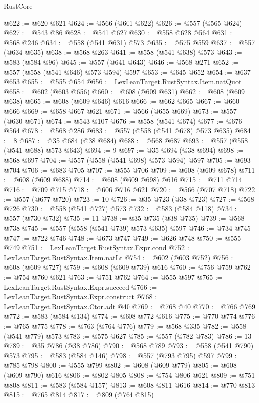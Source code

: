 \begin{lexlean}{RustCore}
\begin{coremodule}
@622 := @620 @621
@624 := @566 (@601 @622)
@626 := @557 (@565 @624)
@627 := @543 @86
@628 := @541 @627
@630 := @558 @628 @564
@631 := @568 @246
@634 := @558 (@541 @631) @573
@635 := @575 @559
@637 := @557 (@634 @635)
@638 := @568 @263
@641 := @558 (@541 @638) @573
@643 := @583 (@584 @96)
@645 := @557 (@641 @643)
@646 := @568 @271
@652 := @557 (@558 (@541 @646) @573 @594) @597
@653 := @645 @652
@654 := @637 @653
@655 := @555 @654
@656 := LexLeanTarget.RustSyntax.Item.natQuot
@658 := @602 (@603 @656)
@660 := @608 (@609 @631)
@662 := @608 (@609 @638)
@665 := @608 (@609 @646) @616
@666 := @662 @665
@667 := @660 @666
@669 := @658 @667 @621
@671 := @566 (@655 @669)
@673 := @557 (@630 @671)
@674 := @543 @107
@676 := @558 (@541 @674)
@677 := @676 @564
@678 := @568 @286
@683 := @557 (@558 (@541 @678) @573 @635)
@684 := 8
@687 := @35 @684 (@38 @684)
@688 := @568 @687
@693 := @557 (@558 (@541 @688) @573 @643)
@694 := 9
@697 := @35 @694 (@38 @694)
@698 := @568 @697
@704 := @557 (@558 (@541 @698) @573 @594) @597
@705 := @693 @704
@706 := @683 @705
@707 := @555 @706
@709 := @608 (@609 @678)
@711 := @608 (@609 @688)
@714 := @608 (@609 @698) @616
@715 := @711 @714
@716 := @709 @715
@718 := @606 @716 @621
@720 := @566 (@707 @718)
@722 := @557 (@677 @720)
@723 := 10
@726 := @35 @723 (@38 @723)
@727 := @568 @726
@730 := @558 (@541 @727) @573
@732 := @583 (@584 @118)
@734 := @557 (@730 @732)
@735 := 11
@738 := @35 @735 (@38 @735)
@739 := @568 @738
@745 := @557 (@558 (@541 @739) @573 @635) @597
@746 := @734 @745
@747 := @722 @746
@748 := @673 @747
@749 := @626 @748
@750 := @555 @749
@751 := LexLeanTarget.RustSyntax.Expr.cond
@752 := LexLeanTarget.RustSyntax.Item.natLt
@754 := @602 (@603 @752)
@756 := @608 (@609 @727)
@759 := @608 (@609 @739) @616
@760 := @756 @759
@762 := @754 @760 @621
@763 := @751 @762
@764 := @555 @597
@765 := LexLeanTarget.RustSyntax.Expr.succeed
@766 := LexLeanTarget.RustSyntax.Expr.construct
@768 := LexLeanTarget.RustSyntax.Ctor.adt @40
@769 := @768 @40
@770 := @766 @769
@772 := @583 (@584 @134)
@774 := @608 @772 @616
@775 := @770 @774
@776 := @765 @775
@778 := @763 (@764 @776)
@779 := @568 @335
@782 := @558 (@541 @779) @573
@783 := @575 @627
@785 := @557 (@782 @783)
@786 := 13
@789 := @35 @786 (@38 @786)
@790 := @568 @789
@793 := @558 (@541 @790) @573
@795 := @583 (@584 @146)
@798 := @557 (@793 @795) @597
@799 := @785 @798
@800 := @555 @799
@802 := @608 (@609 @779)
@805 := @608 (@609 @790) @616
@806 := @802 @805
@808 := @754 @806 @621
@809 := @751 @808
@811 := @583 (@584 @157)
@813 := @608 @811 @616
@814 := @770 @813
@815 := @765 @814
@817 := @809 (@764 @815)

\end{coremodule}
\end{lexlean}
